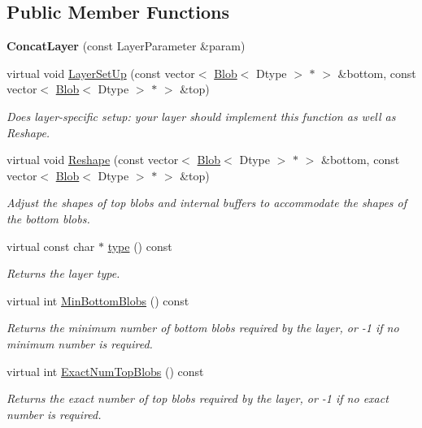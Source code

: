 \subsection*{Public Member Functions}
\begin{DoxyCompactItemize}
\item 
{\bfseries Concat\+Layer} (const Layer\+Parameter \&param)\hypertarget{classcaffe_1_1ConcatLayer_aa06930bae7ed23c88546f35323e1792d}{}\label{classcaffe_1_1ConcatLayer_aa06930bae7ed23c88546f35323e1792d}

\item 
virtual void \hyperlink{classcaffe_1_1ConcatLayer_a12555c990bab5fefb25573b3be8a3fbb}{Layer\+Set\+Up} (const vector$<$ \hyperlink{classcaffe_1_1Blob}{Blob}$<$ Dtype $>$ $\ast$ $>$ \&bottom, const vector$<$ \hyperlink{classcaffe_1_1Blob}{Blob}$<$ Dtype $>$ $\ast$ $>$ \&top)
\begin{DoxyCompactList}\small\item\em Does layer-\/specific setup\+: your layer should implement this function as well as Reshape. \end{DoxyCompactList}\item 
virtual void \hyperlink{classcaffe_1_1ConcatLayer_a1bd9d7ac345ea8ac22ff292190d34fc2}{Reshape} (const vector$<$ \hyperlink{classcaffe_1_1Blob}{Blob}$<$ Dtype $>$ $\ast$ $>$ \&bottom, const vector$<$ \hyperlink{classcaffe_1_1Blob}{Blob}$<$ Dtype $>$ $\ast$ $>$ \&top)
\begin{DoxyCompactList}\small\item\em Adjust the shapes of top blobs and internal buffers to accommodate the shapes of the bottom blobs. \end{DoxyCompactList}\item 
virtual const char $\ast$ \hyperlink{classcaffe_1_1ConcatLayer_abf0cda02b061db51e59e56db4c5ce7c8}{type} () const \hypertarget{classcaffe_1_1ConcatLayer_abf0cda02b061db51e59e56db4c5ce7c8}{}\label{classcaffe_1_1ConcatLayer_abf0cda02b061db51e59e56db4c5ce7c8}

\begin{DoxyCompactList}\small\item\em Returns the layer type. \end{DoxyCompactList}\item 
virtual int \hyperlink{classcaffe_1_1ConcatLayer_a5209b379f1c4897414243a155e21602c}{Min\+Bottom\+Blobs} () const 
\begin{DoxyCompactList}\small\item\em Returns the minimum number of bottom blobs required by the layer, or -\/1 if no minimum number is required. \end{DoxyCompactList}\item 
virtual int \hyperlink{classcaffe_1_1ConcatLayer_a3ee6697895b9c39e60b0019eedd7af68}{Exact\+Num\+Top\+Blobs} () const 
\begin{DoxyCompactList}\small\item\em Returns the exact number of top blobs required by the layer, or -\/1 if no exact number is required. \end{DoxyCompactList}\end{DoxyCompactItemize}
